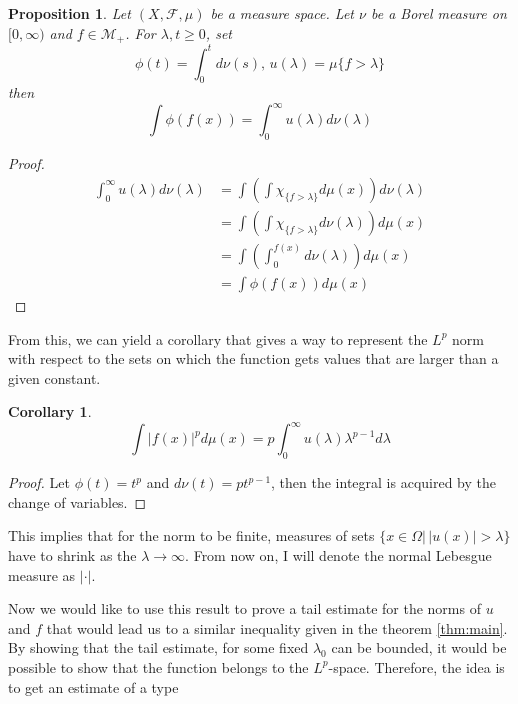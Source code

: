 \documentclass[12pt]{artikel1}
\newtheorem{proposition}{Proposition}[section]
\newtheorem{corollary}{Corollary}[theorem]
\begin{document}
\begin{proposition}
    Let $(X,\mathcal{F},\mu)$ be a measure space. Let $\nu$ be a Borel measure on $[0,\infty)$ and $f\in\mathcal{M}_+$. For $\lambda,t\geq0$, set
    \begin{equation*}
        \phi(t)=\int_0^td\nu(s),\, u(\lambda)=\mu\{f>\lambda\}
    \end{equation*}
    then
    \begin{equation*}
        \int \phi(f(x))=\int_0^\infty u(\lambda)d\nu(\lambda)
    \end{equation*}
\end{proposition}
\begin{proof}
    \begin{align*}
        \int_0^\infty u(\lambda)d\nu(\lambda)&=\int\left(\int\chi_{\{f>\lambda\}}d\mu(x)\right)d\nu(\lambda) \\
        &= \int\left(\int\chi_{\{f>\lambda\}}d\nu(\lambda)\right)d\mu(x) \\
        &=\int\left(\int_0^{f(x)}d\nu(\lambda)\right)d\mu(x) \\
        &=\int\phi(f(x))d\mu(x)
    \end{align*}
\end{proof}

\noindent From this, we can yield a corollary that gives a way to represent the $L^p$ norm with respect to the sets on which the function gets values that are larger than a given constant.

\begin{corollary}\label{cor:layered-cake}
    \begin{equation*}
        \int|f(x)|^pd\mu(x)=p\int_0^\infty u(\lambda)\lambda^{p-1}d\lambda
    \end{equation*}
\end{corollary}
\begin{proof}
    Let $\phi(t)=t^p$ and $d\nu(t)=pt^{p-1}$, then the integral is acquired by the change of variables.
\end{proof}

\noindent This implies that for the norm to be finite, measures of sets $\{x\in\Omega|\,|u(x)|>\lambda\}$ have to shrink as the $\lambda\rightarrow\infty$. From now on, I will denote the normal Lebesgue measure as $|\cdot|$.

Now we would like to use this result to prove a tail estimate for the norms of $u$ and $f$ that would lead us to a similar inequality given in the theorem \ref{thm:main}. By showing that the tail estimate, for some fixed $\lambda_0$ can be bounded, it would be possible to show that the function belongs to the $L^p$-space. Therefore, the idea is to get an estimate of a type
\end{document}
